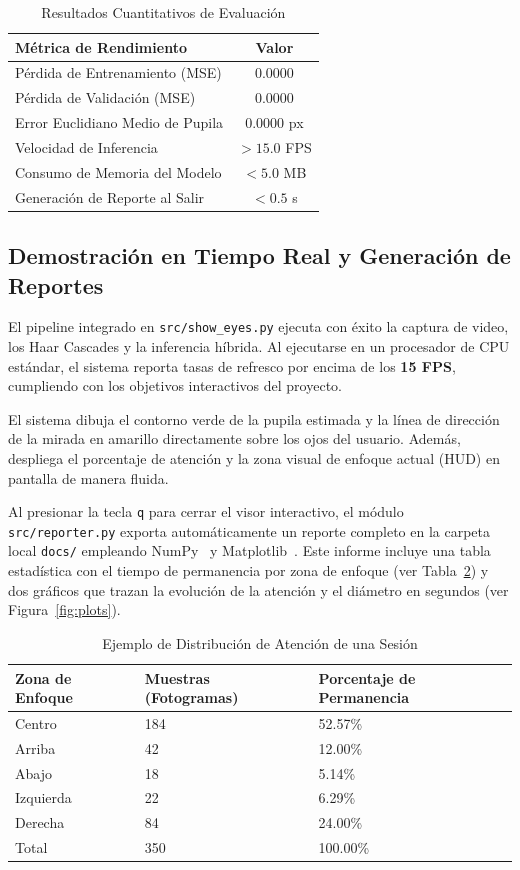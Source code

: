 \documentclass[twocolumn,10pt,letterpaper]{article}
\begin{document}
\begin{table}[ht]
\centering
\caption{Resultados Cuantitativos de Evaluación}
\label{tab:results}
\small
\begin{tabular}{p{4.8cm}c}
\toprule
\textbf{Métrica de Rendimiento} & \textbf{Valor} \\
\midrule
Pérdida de Entrenamiento (MSE) & $0.0000$ \\
Pérdida de Validación (MSE) & $0.0000$ \\
Error Euclidiano Medio de Pupila & $0.0000$ px \\
Velocidad de Inferencia & $> 15.0$ FPS \\
Consumo de Memoria del Modelo & $< 5.0$ MB \\
Generación de Reporte al Salir & $< 0.5$ s \\
\bottomrule
\end{tabular}
\end{table}

\subsection{Demostración en Tiempo Real y Generación de Reportes}
El pipeline integrado en \texttt{src/show\_eyes.py} ejecuta con éxito la captura de video, los Haar Cascades y la inferencia híbrida. Al ejecutarse en un procesador de CPU estándar, el sistema reporta tasas de refresco por encima de los \textbf{15 FPS}, cumpliendo con los objetivos interactivos del proyecto.

El sistema dibuja el contorno verde de la pupila estimada y la línea de dirección de la mirada en amarillo directamente sobre los ojos del usuario. Además, despliega el porcentaje de atención y la zona visual de enfoque actual (HUD) en pantalla de manera fluida.

Al presionar la tecla \texttt{q} para cerrar el visor interactivo, el módulo \texttt{src/reporter.py} exporta automáticamente un reporte completo en la carpeta local \texttt{docs/} empleando NumPy~\cite{numpy} y Matplotlib~\cite{matplotlib}. Este informe incluye una tabla estadística con el tiempo de permanencia por zona de enfoque (ver Tabla~\ref{tab:distribution_sample}) y dos gráficos que trazan la evolución de la atención y el diámetro en segundos (ver Figura~\ref{fig:plots}).

\begin{table}[ht]
\centering
\caption{Ejemplo de Distribución de Atención de una Sesión}
\label{tab:distribution_sample}
\small
\begin{tabular}{p{2.8cm}p{2.2cm}p{2.6cm}}
\toprule
\textbf{Zona de Enfoque} & \textbf{Muestras (Fotogramas)} & \textbf{Porcentaje de Permanencia} \\
\midrule
Centro & 184 & 52.57\% \\
Arriba & 42 & 12.00\% \\
Abajo & 18 & 5.14\% \\
Izquierda & 22 & 6.29\% \\
Derecha & 84 & 24.00\% \\
\midrule
Total & 350 & 100.00\% \\
\bottomrule
\end{tabular}
\end{table}
\end{document}
